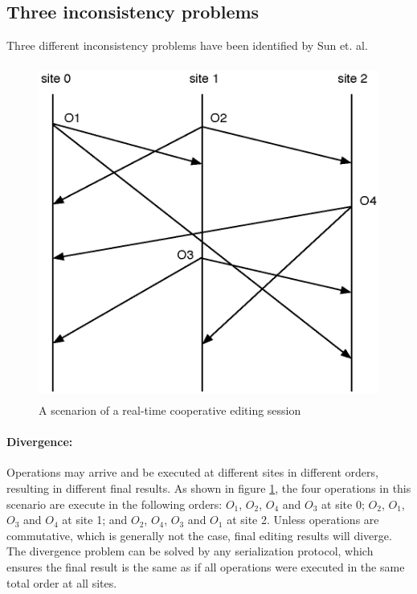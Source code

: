 \documentclass[11pt,a4paper]{article}
\begin{document}
\subsection{Three inconsistency problems}
Three different inconsistency problems have been identified by {Sun et. al}\cite{sun:achieving}.

\begin{figure}
 \centering
 \includegraphics[width=4.68in,height=4.33in]{../../images/example1.eps}
 \caption{A scenarion of a real-time cooperative editing session}
 \label{fig:example1}
\end{figure}

\paragraph{Divergence:}
Operations may arrive and be executed at different sites in different orders, resulting in different final results. As shown in figure \ref{fig:example1}, the four operations in this scenario are execute in the following orders: $O_{1}$, $O_{2}$, $O_{4}$ and $O_{3}$ at site 0; $O_{2}$, $O_{1}$, $O_{3}$ and $O_{4}$ at site 1; and $O_{2}$, $O_{4}$, $O_{3}$ and $O_{1}$ at site 2. Unless operations are commutative, which is generally not the case, final editing results will diverge. The divergence problem can be solved by any serialization protocol, which ensures the final result is the same as if all operations were executed in the same total order at all sites.
\end{document}
